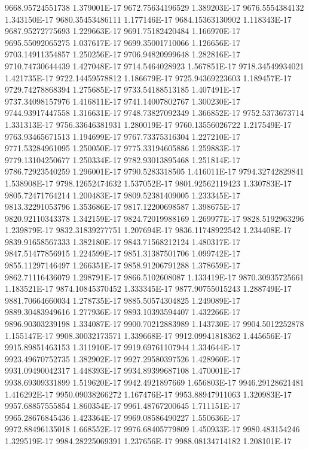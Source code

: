 9668.95724551738  1.379001E-17
9672.75634196529  1.389203E-17
9676.5554384132  1.343150E-17
9680.35453486111  1.177146E-17
9684.15363130902  1.118343E-17
9687.95272775693  1.229663E-17
9691.75182420484  1.166970E-17
9695.55092065275  1.037617E-17
9699.35001710066  1.126656E-17
9703.14911354857  1.250256E-17
9706.94820999648  1.282816E-17
9710.74730644439  1.427048E-17
9714.5464028923  1.567851E-17
9718.34549934021  1.421735E-17
9722.14459578812  1.186679E-17
9725.94369223603  1.189457E-17
9729.74278868394  1.275685E-17
9733.54188513185  1.407491E-17
9737.34098157976  1.416811E-17
9741.14007802767  1.300230E-17
9744.93917447558  1.316631E-17
9748.73827092349  1.366852E-17
9752.5373673714  1.331313E-17
9756.33646381931  1.280019E-17
9760.13556026722  1.217549E-17
9763.93465671513  1.194699E-17
9767.73375316304  1.227210E-17
9771.53284961095  1.250050E-17
9775.33194605886  1.259883E-17
9779.13104250677  1.250334E-17
9782.93013895468  1.251814E-17
9786.72923540259  1.296001E-17
9790.5283318505  1.416011E-17
9794.32742829841  1.538908E-17
9798.12652474632  1.537052E-17
9801.92562119423  1.330783E-17
9805.72471764214  1.200483E-17
9809.52381409005  1.233345E-17
9813.32291053796  1.353686E-17
9817.12200698587  1.398675E-17
9820.92110343378  1.342159E-17
9824.72019988169  1.269977E-17
9828.5192963296  1.239879E-17
9832.31839277751  1.207694E-17
9836.11748922542  1.234408E-17
9839.91658567333  1.382180E-17
9843.71568212124  1.480317E-17
9847.51477856915  1.224599E-17
9851.31387501706  1.099742E-17
9855.11297146497  1.266351E-17
9858.91206791288  1.378659E-17
9862.71116436079  1.298791E-17
9866.5102608087  1.133419E-17
9870.30935725661  1.183521E-17
9874.10845370452  1.333345E-17
9877.90755015243  1.288749E-17
9881.70664660034  1.278735E-17
9885.50574304825  1.249089E-17
9889.30483949616  1.277936E-17
9893.10393594407  1.432266E-17
9896.90303239198  1.334087E-17
9900.70212883989  1.143730E-17
9904.5012252878  1.155147E-17
9908.30032173571  1.339668E-17
9912.09941818362  1.445656E-17
9915.89851463153  1.311910E-17
9919.69761107944  1.334644E-17
9923.49670752735  1.382902E-17
9927.29580397526  1.428960E-17
9931.09490042317  1.448393E-17
9934.89399687108  1.470001E-17
9938.69309331899  1.519620E-17
9942.4921897669  1.656803E-17
9946.29128621481  1.416292E-17
9950.09038266272  1.167476E-17
9953.88947911063  1.320983E-17
9957.68857555854  1.860354E-17
9961.48767200645  1.711151E-17
9965.28676845436  1.423364E-17
9969.08586490227  1.550636E-17
9972.88496135018  1.668552E-17
9976.68405779809  1.450933E-17
9980.483154246  1.329519E-17
9984.28225069391  1.237656E-17
9988.08134714182  1.208101E-17
